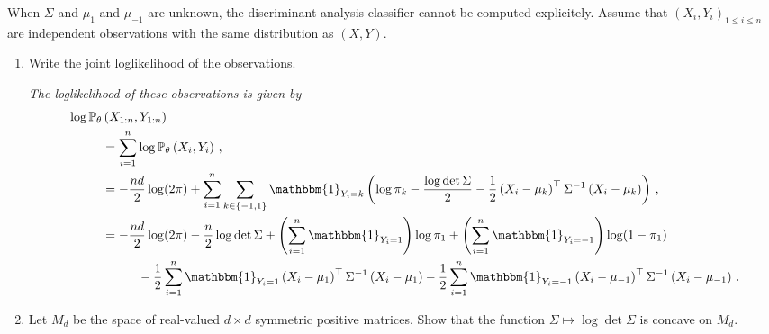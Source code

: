 \documentclass[a4paper,10pt,fleqn]{article}
\newcommand{\eqsp}{\,}
\newcommand{\bP}{\mathbb{P}}
\newcommand{\1}{\ensuremath{\mathbbm{1}}}
\begin{document}
When $\Sigma$ and $\mu_1$ and $\mu_{-1}$ are unknown, the  discriminant analysis classifier cannot be computed explicitely. Assume that  $(X_i,Y_i)_{1\leqslant i\leqslant n}$ are independent observations with the same distribution as $(X,Y)$.
\begin{enumerate}
\item Write the joint loglikelihood of the observations.

\vspace{.2cm}

{\em
The loglikelihood of these observations is given by
\begin{align*}
\log \bP_{\theta}&\left(X_{1:n},Y_{1:n}\right) \\
&=\sum_{i=1}^n \log \bP_{\theta} \left(X_{i},Y_{i}\right)\eqsp,\\
&= - \frac{nd}{2} \log(2\pi)+\sum_{i=1}^n\sum_{k\in\{-1,1\}}\1_{Y_i=k}\left(\log \pi_{k} -\frac{\log \det \Sigma}{2} - \frac{1}{2}\left(X_i - \mu_{k}\right)^\top\Sigma^{-1}\left(X_i - \mu_{k}\right)\right) \eqsp,\\
&= - \frac{nd}{2} \log(2\pi)-\frac{n}2 \log\det\Sigma + \left(\sum_{i=1}^n\1_{Y_i=1}\right)\log \pi_1 + \left(\sum_{i=1}^n\1_{Y_i=-1}\right)\log (1-\pi_{1})\\
& \hspace{1cm}-  \frac{1}{2}\sum_{i=1}^n\1_{Y_i=1}\left(X_i - \mu_{1}\right)^\top\Sigma^{-1}\left(X_i - \mu_{1}\right) -  \frac{1}{2}\sum_{i=1}^n\1_{Y_i=-1}\left(X_i - \mu_{-1}\right)^\top\Sigma^{-1}\left(X_i - \mu_{-1}\right)\eqsp.
\end{align*}
}

\item Let $M_d$ be the space of real-valued $d \times d$ symmetric positive matrices. Show that the function $\Sigma \mapsto \log \det \Sigma$ is concave on $M_d$.

\vspace{.2cm}


\end{enumerate}
\end{document}
